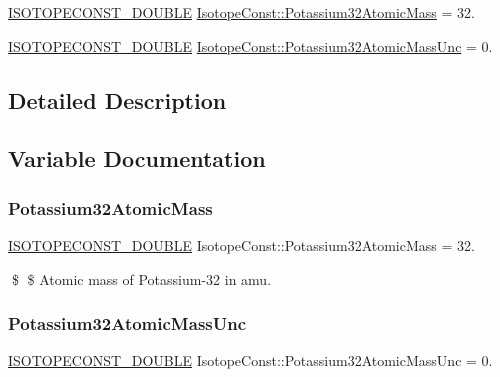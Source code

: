 \begin{DoxyCompactItemize}
\item 
\mbox{\hyperlink{group___isotope_const-_macros_ga8f45a7272ce02c0b4c65c44636ed719a}{I\+S\+O\+T\+O\+P\+E\+C\+O\+N\+S\+T\+\_\+\+D\+O\+U\+B\+LE}} \mbox{\hyperlink{group___isotope_const-_potassium-_k32_ga0dfdf0de9d264a63fbaf02890a07e3ac}{Isotope\+Const\+::\+Potassium32\+Atomic\+Mass}} = 32.
\item 
\mbox{\hyperlink{group___isotope_const-_macros_ga8f45a7272ce02c0b4c65c44636ed719a}{I\+S\+O\+T\+O\+P\+E\+C\+O\+N\+S\+T\+\_\+\+D\+O\+U\+B\+LE}} \mbox{\hyperlink{group___isotope_const-_potassium-_k32_gabd4a6c1fda5be542896989797d7f35c2}{Isotope\+Const\+::\+Potassium32\+Atomic\+Mass\+Unc}} = 0.
\end{DoxyCompactItemize}


\subsection{Detailed Description}


\subsection{Variable Documentation}
\mbox{\label{group___isotope_const-_potassium-_k32_ga0dfdf0de9d264a63fbaf02890a07e3ac}} 
\subsubsection{\texorpdfstring{Potassium32\+Atomic\+Mass}{Potassium32AtomicMass}}
{\footnotesize\ttfamily \mbox{\hyperlink{group___isotope_const-_macros_ga8f45a7272ce02c0b4c65c44636ed719a}{I\+S\+O\+T\+O\+P\+E\+C\+O\+N\+S\+T\+\_\+\+D\+O\+U\+B\+LE}} Isotope\+Const\+::\+Potassium32\+Atomic\+Mass = 32.}

\$ \$ Atomic mass of Potassium-\/32 in amu. \mbox{\label{group___isotope_const-_potassium-_k32_gabd4a6c1fda5be542896989797d7f35c2}} 
\subsubsection{\texorpdfstring{Potassium32\+Atomic\+Mass\+Unc}{Potassium32AtomicMassUnc}}
{\footnotesize\ttfamily \mbox{\hyperlink{group___isotope_const-_macros_ga8f45a7272ce02c0b4c65c44636ed719a}{I\+S\+O\+T\+O\+P\+E\+C\+O\+N\+S\+T\+\_\+\+D\+O\+U\+B\+LE}} Isotope\+Const\+::\+Potassium32\+Atomic\+Mass\+Unc = 0.}

